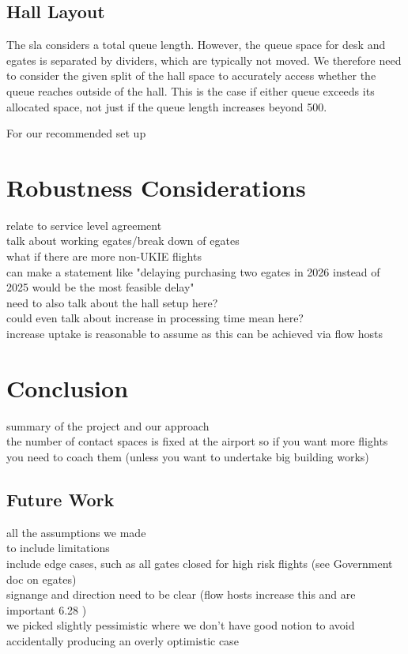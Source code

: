 \documentclass[10pt]{article}
\begin{document}
\subsection{Hall Layout}
The \gls{sla} considers a total queue length. However, the queue space for desk and \glspl{egate} is separated by dividers, which are typically not moved. We therefore need to consider the given split of the hall space to accurately access whether the queue reaches outside of the hall. This is the case if either queue exceeds its allocated space, not just if the queue length increases beyond 500. 

For our recommended set up
 

\section{Robustness Considerations} \label{sec:robustness}
relate to service level agreement \\
talk about working \glspl{egate}/break down of \glspl{egate}  \\
what if there are more non-UKIE flights  \\  
can make a statement like "delaying purchasing two egates in 2026 instead of 2025 would be the most feasible delay" \\
need to also talk about the hall setup here? \\
could even talk about increase in processing time mean here? \\
increase uptake is reasonable to assume as this can be achieved via flow hosts



\section{Conclusion}
summary of the project and our approach \\
the number of contact spaces is fixed at the airport so if you want more flights you need to coach them (unless you want to undertake big building works) 


\subsection{Future Work}
all the assumptions we made \\
to include limitations \\
include edge cases, such as all gates closed for high risk flights (see Government doc on \glspl{egate}) \\
signange and direction need to be clear (flow hosts increase this and are important 6.28 \cite{Inspection_eGates}) \\
we picked slightly pessimistic where we don't have good notion to avoid accidentally producing an overly optimistic case

{\footnotesize
}
% 
\end{document}
